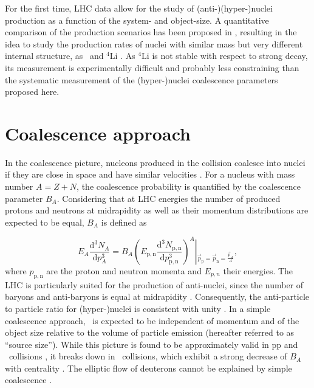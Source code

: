 \documentclass[%
 reprint,
 amsmath,amssymb,
 aps,
]{revtex4-1}
\begin{document}
\indent For the first time, LHC data allow for the study of \mbox{(anti-)(hyper-)nuclei} production as a function of the system- and object-size. 
A quantitative comparison of the production scenarios has been proposed in \cite{Mrowczynski:2016xqm}, resulting in the idea  to study the production rates of nuclei with similar mass but very different internal structure, as \hefour~and ${}^{4}\mathrm{Li}$ \cite{Bazak:2018hgl}. 
As ${}^{4}\mathrm{Li}$ is not stable with respect to strong decay, its measurement is experimentally difficult and probably less constraining than the systematic measurement of the (hyper-)nuclei coalescence parameters proposed here.

 
\section{Coalescence approach} \label{sec:coalescence}
In the coalescence picture, nucleons produced in the collision coalesce into nuclei if they are close in space and have similar velocities \cite{Butler:1963,Kapusta:1980}. 
For a nucleus with mass number $A = Z + N$, the coalescence probability is quantified by the coalescence parameter $B_{A}$.
Considering that at LHC energies the number of produced protons and neutrons at midrapidity as well as their momentum distributions are expected to be equal, $B_{A}$ is defined as

\begin{equation}
E_{A}\frac{\mathrm{d}^{3}N_{A}}{\mathrm{d}p_{A}^{3}}=B_{A}{\left(E_{\mathrm{p,n}}\frac{\mathrm{d}^{3}N_{\mathrm{p,n}}}{\mathrm{d}p_{\mathrm{p,n}}^{3}}\right)^{A}}\left\vert_{\vec{p}_{\mathrm{p}}=\vec{p}_{\mathrm{n}}=\frac{\vec{p}_{A}}{A}} \right.,
\label{eq:BA}
\end{equation}
%
where $p_{\mathrm{p,n}}$ are the proton and neutron momenta and $E_{p,n}$ their energies.
%
The LHC is particularly suited for the production of anti-nuclei, since the number of baryons and anti-baryons is equal at midrapidity \cite{Abbas:2013rua}. Consequently, the anti-particle to particle ratio for \mbox{(hyper-)nuclei} is consistent with unity \cite{ALICE:nucleipp2017, Acharya:2019rgc, anielski-HQ14, Acharya:2017dmc, Adam:2015yta}.
In a simple coalescence approach, \bA~is expected to be independent of momentum and of the object size relative to the volume of particle emission (hereafter referred to as ``source size'').
While this picture is found to be approximately valid in pp and \pPb~collisions \cite{ALICE:nucleipp2017, Acharya:2019rgc, anielski-HQ14}, it breaks down in \PbPb~collisions, which exhibit a strong decrease of $B_{A}$ with centrality \cite{ALICE:deuteronppPbPb2015}. 
The elliptic flow of deuterons cannot be explained by simple coalescence \cite{Acharya:2017dmc}. 
\end{document}
